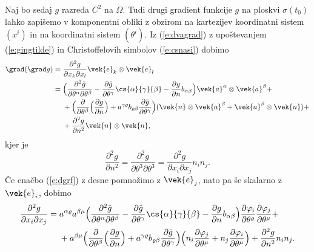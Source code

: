 Naj bo sedaj $g$ razreda $C^2$ na $\Omega$. Tudi drugi gradient funkcije $g$ na ploskvi $\sigma(t_0)$
lahko zapišemo v komponentni obliki z obzirom na kartezijev koordinatni
sistem $(x^i)$ in na koordinatni sistem $(\theta^i)$. Iz (\ref{e:dvagrad})
z upoštevanjem (\ref{e:gingtilde}) in Christoffelovih simbolov (\ref{e:csnasi}) dobimo
\begin{align}
	\grad(\grad g) =\;&\frac{\partial^2 g}{\partial x_k\partial x_l}\vek{e}_k\otimes\vek{e}_l\nonumber\\
	=\;&\Big( \frac{\partial^2\tilde{g}}{\partial\theta^{\alpha}\partial\theta^{\beta}}-
	\frac{\partial\tilde{g}}{\partial\theta^{\gamma}}\cs{\alpha}{\gamma}{\beta}-
	\frac{\partial g}{\partial n}b_{\alpha\beta}\Big)\vek{a}^{\alpha}\otimes\vek{a}^{\beta}+\nonumber\\
	&+\Big(\frac{\partial}{\partial\theta^{\beta}}\Big(\frac{\partial g}{\partial n}\Big)+
	a^{\gamma\varrho}b_{\varrho\beta}\frac{\partial\tilde{g}}{\partial\theta^{\gamma}}\Big)
	(\vek{n}\otimes\vek{a}^{\beta}+\vek{a}^{\beta}\otimes\vek{n})+\nonumber\\
	&+\frac{\partial^2 g}{\partial n^2}\vek{n}\otimes\vek{n}, \label{e:dgrf}
\end{align}
kjer je
\[
	\frac{\partial^2 g}{\partial n^2}=\frac{\partial^2 g}{\partial\theta^3\partial\theta^3}=
	\frac{\partial^2 g}{\partial x_i\partial x_j}n_in_j.
\]
Če enačbo (\ref{e:dgrf}) z desne pomnožimo z $\vek{e}_j$, nato pa še skalarno z $\vek{e}_i$, dobimo
\begin{align}
	\frac{\partial^2 g}{\partial x_i\partial x_j}=\;&
	a^{\alpha\varrho}a^{\beta\mu}\Big( \frac{\partial^2\tilde{g}}{\partial\theta^{\alpha}\partial\theta^{\beta}}-
	\frac{\partial\tilde{g}}{\partial\theta^{\gamma}}\cs{\alpha}{\gamma}{\beta}-
	\frac{\partial g}{\partial n}b_{\alpha\beta}\Big)
	\frac{\partial\varphi_i}{\partial\theta^{\varrho}}\frac{\partial\varphi_j}{\partial\theta^{\mu}}+ \nonumber \\
	&+a^{\beta\mu}\Big(\frac{\partial}{\partial\theta^{\beta}}\Big(\frac{\partial g}{\partial n}\Big)+
	a^{\gamma\varrho}b_{\varrho\beta}\frac{\partial\tilde{g}}{\partial\theta^{\gamma}}\Big)
	\Big(n_i\frac{\partial\varphi_j}{\partial\theta^{\mu}}+n_j\frac{\partial\varphi_i}{\partial\theta^{\mu}}\Big)+
	\frac{\partial^2 g}{\partial n^2}n_in_j.
	\label{e:kpzdpo1}
\end{align}

